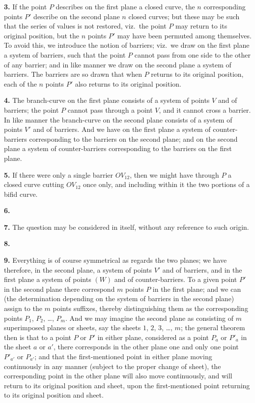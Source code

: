 \documentclass[11pt,a4paper]{book}
\begin{document}
\medskip
\noindent\textbf{3.}\quad
If the point $P$ describes on the first plane a closed curve, the $n$ corresponding points $P'$ describe on the second plane $n$ closed curves; but these may be such that the series of values is not restored, viz.\ the point $P$ may return to its original position, but the $n$ points $P'$ may have been permuted among themselves. To avoid this, we introduce the notion of barriers; viz.\ we draw on the first plane a system of barriers, such that the point $P$ cannot pass from one side to the other of any barrier; and in like manner we draw on the second plane a system of barriers. The barriers are so drawn that when $P$ returns to its original position, each of the $n$ points $P'$ also returns to its original position.

\medskip
\noindent\textbf{4.}\quad
The branch-curve on the first plane consists of a system of points $V$ and of barriers; the point $P$ cannot pass through a point $V$, and it cannot cross a barrier. In like manner the branch-curve on the second plane consists of a system of points $V'$ and of barriers. And we have on the first plane a system of counter-barriers corresponding to the barriers on the second plane; and on the second plane a system of counter-barriers corresponding to the barriers on the first plane.

\medskip
\noindent\textbf{5.}\quad
If there were only a single barrier $OV_{12}$, then we might have through $P$ a closed curve cutting $OV_{12}$ once only, and including within it the two portions of a bifid curve.

\medskip
\noindent\textbf{6.}

\medskip
\noindent\textbf{7.}\quad
The question may be considered in itself, without any reference to such origin.

\medskip
\noindent\textbf{8.}

\medskip
\noindent\textbf{9.}\quad
Everything is of course symmetrical as regards the two planes; we have therefore, in the second plane, a system of points $V'$ and of barriers, and in the first plane a system of points $(W)$ and of counter-barriers. To a given point $P'$ in the second plane there correspond $m$ points $P$ in the first plane; and we can (the determination depending on the system of barriers in the second plane) assign to the $m$ points suffixes, thereby distinguishing them as the corresponding points $P_1$, $P_2$, \dots, $P_m$. And we may imagine the second plane as consisting of $m$ superimposed planes or sheets, say the sheets $1$, $2$, $3$, \dots, $m$; the general theorem then is that to a point $P$ or $P'$ in either plane, considered as a point $P_a$ or $P'_a$ in the sheet $a$ or $a'$, there corresponds in the other plane one and only one point $P'_{a'}$ or $P_{a'}$; and that the first-mentioned point in either plane moving continuously in any manner (subject to the proper change of sheet), the corresponding point in the other plane will also move continuously, and will return to its original position and sheet, upon the first-mentioned point returning to its original position and sheet.
\end{document}
